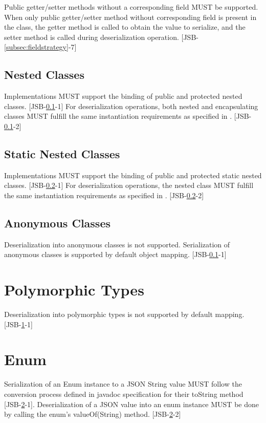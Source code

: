 Public getter/setter methods without a corresponding field MUST be supported. 
When only public getter/setter method without corresponding field is present in the class, the getter method is called to obtain the value to serialize, and the setter method is called during deserialization operation. [JSB-\ref{subsec:fieldstrategy}-7]

\subsection{Nested Classes}
\label{subsec:nestedclass}
Implementations MUST support the binding of public and protected nested classes. [JSB-\ref{subsec:nestedclass}-1] 
For deserialization operations, both nested and encapsulating classes MUST fulfill the same instantiation requirements as specified in . [JSB-\ref{subsec:nestedclass}-2]

\subsection{Static Nested Classes}
\label{subsec:staticnested}
Implementations MUST support the binding of public and protected static nested classes. [JSB-\ref{subsec:staticnested}-1] 
For deserialization operations, the nested class MUST fulfill the same instantiation requirements as specified in . [JSB-\ref{subsec:staticnested}-2]

\subsection{Anonymous Classes}
\label{subsec:anonymous}
Deserialization into anonymous classes is not supported. Serialization of anonymous classes is supported by default object mapping. [JSB-\ref{subsec:nestedclass}-1]

\section{Polymorphic Types}
\label{sec:polymorph}
Deserialization into polymorphic types is not supported by default mapping. [JSB-\ref{sec:polymorph}-1]

\section{Enum}
\label{sec:enum}
Serialization of an Enum instance to a JSON String value 
MUST follow the conversion process defined in javadoc specification for their toString method [JSB-\ref{sec:enum}-1]. 
Deserialization of a JSON value into an enum instance MUST be done by calling the enum's valueOf(String) method. [JSB-\ref{sec:enum}-2]

